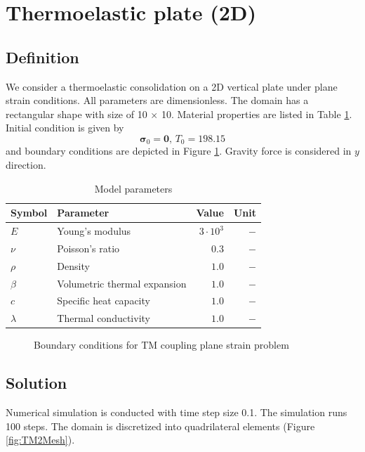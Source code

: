 \section{Thermoelastic plate (2D)}
\label{sec:tm2d}
\subsection{Definition}
We consider a thermoelastic consolidation on a 2D vertical plate under plane strain conditions. All parameters are dimensionless. The domain has a rectangular shape with size of 10 $\times$ 10. Material properties are listed in Table \ref{tab:tm2D}. Initial condition is given by
\[
\mathbf \sigma_{0} = \mathbf 0, \, T_0=198.15
\]
and boundary conditions are depicted in Figure \ref{fig:TMbc}. Gravity force is considered in $y$ direction. 

\begin{table}[!htb]
\caption{Model parameters}
\label{tab:tm2D}
\centering
\begin{tabular}{llrr}
\toprule
Symbol & Parameter & Value & Unit \\
\midrule
$E$ & Young's modulus & $3 \cdot 10^{3}$  & $-$ \\
$\nu$ & Poisson's ratio & $0.3$       & $-$ \\
$\rho$ & Density    & $1.0$        & $-$ \\
$\beta$ & Volumetric thermal expansion & $1.0$         & $-$ \\
$c$ & Specific heat capacity & $1.0$         & $-$ \\
$\lambda$ & Thermal conductivity & $1.0$         & $-$ \\
\bottomrule
\end{tabular}
\end{table}

\begin{figure}[!htbp]
\centering
%
\caption{Boundary conditions for TM coupling plane strain problem }
\label{fig:TMbc}
\end{figure}

\subsection{Solution}
Numerical simulation is conducted with time step size 0.1. The simulation runs 100 steps. The domain is discretized into quadrilateral elements (Figure \ref{fig:TM2Mesh}). 

